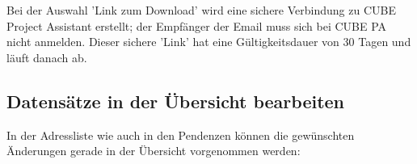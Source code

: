 \begin{figure}[H]
\end{figure}

Bei der Auswahl 'Link zum Download' wird eine sichere Verbindung zu CUBE Project Assistant erstellt; der Empfänger der Email muss sich bei CUBE PA nicht anmelden. Dieser sichere 'Link' hat eine Gültigkeitsdauer von 30 Tagen und läuft danach ab.

\subsection{Datensätze in der Übersicht bearbeiten}
In der Adressliste wie auch in den Pendenzen können die gewünschten Änderungen gerade in der Übersicht vorgenommen werden:

\begin{figure}[H]
\end{figure}

